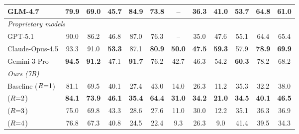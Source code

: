 \begin{table}[t]
{\begin{tabular}{l ccccccccccc}
GLM-4.7                         & 79.9 & 69.0 & 45.7 & 84.9 & 73.8 & -- & 36.3 & 41.0 & 53.7 & 64.8 & 61.0 \\
\midrule
\multicolumn{12}{l}{\textit{Proprietary models}} \\
GPT-5.1                         & 90.0 & 86.2 & 46.8 & 87.0 & 76.3 & -- & 35.0 & 47.6 & 55.1 & 64.4 & 65.4 \\
Claude-Opus-4.5                 & 93.3 & 91.0 & \textbf{53.3} & 87.1 & \textbf{80.9} & \textbf{50.0} & \textbf{47.5} & \textbf{59.3} & 57.9 & \textbf{78.9} & \textbf{69.9} \\
Gemini-3-Pro                    & \textbf{94.5} & \textbf{91.2} & 47.1 & \textbf{91.7} & 76.2 & 42.7 & 46.3 & 54.2 & \textbf{60.3} & 78.2 & 68.2 \\
\midrule
\multicolumn{12}{l}{\textit{Ours (7B)}} \\
\rowcolor{tablegray} Baseline ($R{=}1$)        & 81.1 & 69.5 & 40.1 & 27.4 & 43.0 & 14.0 & 26.3 & 11.2 & 35.3 & 32.2 & 38.0 \\
\rowcolor{tablegray} \modelname{} ($R{=}2$)    & \textbf{84.1} & \textbf{73.9} & \textbf{46.1} & \textbf{35.4} & \textbf{64.4} & \textbf{31.0} & \textbf{34.2} & \textbf{21.0} & \textbf{34.5} & \textbf{40.1} & \textbf{46.5} \\
\rowcolor{tablegray} \modelname{} ($R{=}3$)    & 75.0 & 69.8 & 43.3 & 28.6 & 27.6 & 11.0 & 30.0 & 12.2 & 35.1 & 36.3 & 36.9 \\
\rowcolor{tablegray} \modelname{} ($R{=}4$)    & 76.8 & 67.3 & 40.8 & 24.5 & 22.4 & 9.3 & 26.3 & 9.0 & 41.4 & 39.5 & 34.3 \\
\bottomrule
\end{tabular}}
\end{table}
